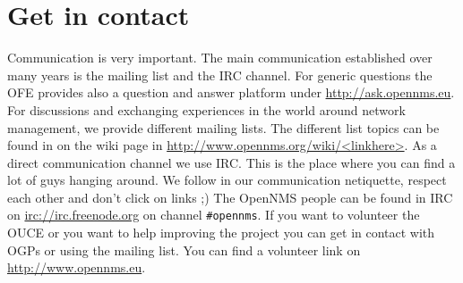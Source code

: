 \section{Get in contact}
Communication is very important. The main communication established over many years is the mailing list and the IRC channel. For generic questions the OFE provides also a question and answer platform under \url{http://ask.opennms.eu}. For discussions and exchanging experiences in the world around network management, we provide different mailing lists. The different list topics can be found in on the wiki page in \url{http://www.opennms.org/wiki/<linkhere>}. 
As a direct communication channel we use IRC. This is the place where you can find a lot of guys hanging around. We follow in our communication netiquette, respect each other and don't click on links ;) The OpenNMS people can be found in IRC on \url{irc://irc.freenode.org} on channel \texttt{\#opennms}. If you want to volunteer the OUCE or you want to help improving the project you can get in contact with OGPs or using the mailing list. You can find a volunteer link on \url{http://www.opennms.eu}.
